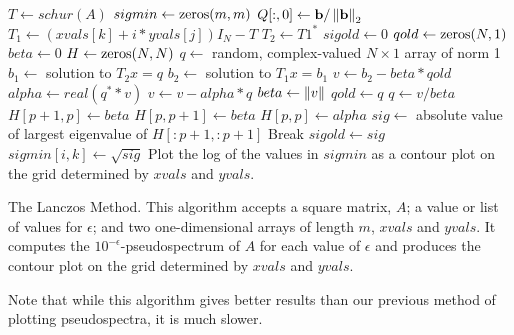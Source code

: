\begin{algorithm}
\begin{algorithmic}[1]
	\State $T \gets schur(A)$			
	\State $sigmin \gets \zeros{m}{m}$
	\State $Q[:,0] \gets {\bf b}/\left\lVert{\bf b}\right\rVert_2$							
		    \State $T_1 \gets (xvals[k]+i*yvals[j])I_N-T$  
		    \State {}
		    \State $T_2 \gets T1^*$        		
		    \State $sigold \gets 0$    
		    \State $qold \gets \zeros{N}{1}$
		    \State $beta \gets 0$
		    \State $H \gets \zeros{N}{N}$
		    \State $q \gets$ random, complex-valued $N \times 1$ array of norm 1 
		    \State {}
			    \State $b_1 \gets$ solution to $T_2x = q$	
			    \State $b_2 \gets$ solution to $T_1x = b_1$
			    \State $v \gets b_2 - beta*qold$
			    \State $alpha \gets real(q^**v)$
			    \State $v \gets v - alpha*q$
			    \State $beta \gets \left\lVert v\right\rVert$
			    \State $qold \gets q$
			    \State $q \gets v/beta$
			    \State $H[p+1,p] \gets beta$
			    \State $H[p,p+1] \gets beta$
			    \State $H[p,p] \gets alpha$
			    \State $sig \gets$ absolute value of largest eigenvalue of $H[:p+1,:p+1]$
			        \State Break    
			    \EndIf
			    \State $sigold \gets sig$
			\EndFor
			\State $sigmin[i,k] \gets \sqrt{sig}$
	    \EndFor
	\EndFor
	\State Plot the log of the values in $sigmin$ as a contour plot on the grid determined by $xvals$ and $yvals$.
\EndProcedure
\end{algorithmic}
\caption{The Lanczos Method. This algorithm accepts a square matrix, $A$; a value or list of values for $\epsilon$; and two one-dimensional arrays of length $m$, $xvals$ and $yvals$. It computes the $10^{-\epsilon}$-pseudospectrum of $A$ for each value of $\epsilon$ and produces the contour plot on the grid determined by $xvals$ and $yvals$.}
\label{alg:lanczos_method}
\end{algorithm}

Note that while this algorithm gives better results than our previous method of plotting pseudospectra, it is much slower.

